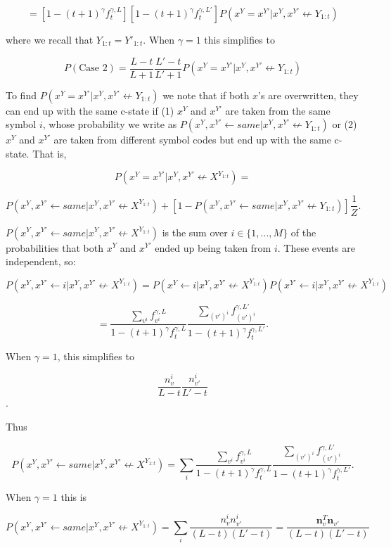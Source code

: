 \documentclass{article}
\begin{document}
$$= [1 - (t+1)^\gamma f^{\gamma,L}_t][1 - (t+1)^\gamma f^{\gamma,L'}_t]P(x^Y = x^{Y'}|x^Y, x^{Y'} \not\leftarrow Y_{1:t})$$

where we recall that $Y_{1:t} = Y'_{1:t}$. When $\gamma = 1$ this simplifies to

$$P(\textrm{Case 2}) = \frac{L-t}{L+1}\frac{L'-t}{L'+1}P(x^Y = x^{Y'}|x^Y, x^{Y'} \not\leftarrow Y_{1:t})$$

To find $P(x^Y = x^{Y'}|x^Y, x^{Y'} \not\leftarrow Y_{1:t})$ we note that if both $x$'s are overwritten, they can end up with the same c-state if (1) $x^Y$ and $x^{Y'}$ are taken from the same symbol $i$, whose probability we write as $P(x^Y, x^{Y'} \leftarrow same|x^Y, x^{Y'} \not\leftarrow Y_{1:t})$ or (2) $x^Y$ and $x^{Y'}$ are taken from different symbol codes but end up with the same c-state. That is,

$$P(x^Y = x^{Y'}|x^Y, x^{Y'} \not\leftarrow X^{Y_{1:t}}) =$$

$$P(x^Y, x^{Y'} \leftarrow same|x^Y, x^{Y'} \not\leftarrow X^{Y_{1:t}}) + [1 - P(x^Y, x^{Y'} \leftarrow same|x^Y, x^{Y'} \not\leftarrow Y_{1:t})]\frac{1}{Z}.$$

$P(x^Y, x^{Y'} \leftarrow same|x^Y, x^{Y'} \not\leftarrow X^{Y_{1:t}})$ is the sum over $i \in \{1, ..., M\}$ of the probabilities that both $x^Y$ and $x^{Y'}$ ended up being taken from $i$. These events are independent, so:

$$P(x^Y, x^{Y'} \leftarrow i|x^Y, x^{Y'} \not\leftarrow X^{Y_{1:t}}) = P(x^Y \leftarrow i|x^Y, x^{Y'} \not\leftarrow X^{Y_{1:t}})P(x^{Y'} \leftarrow i|x^Y, x^{Y'} \not\leftarrow X^{Y_{1:t}})$$

$$ = \frac{\sum\limits_{v^i} f_{v^i}^{\gamma,L}}{1 - (t+1)^\gamma f^{\gamma,L}_t} \frac{\sum\limits_{(v')^i} f^{\gamma,L'}_{(v')^i}}{1 - (t+1)^\gamma f^{\gamma,L'}_t}.$$

When $\gamma = 1$, this simplifies to

$$\frac{n^i_v}{L-t}\frac{n^i_{v'}}{L'-t}$$.

Thus

$$P(x^Y, x^{Y'} \leftarrow same|x^Y, x^{Y'} \not\leftarrow X^{Y_{1:t}}) = \sum_i \frac{\sum\limits_{v^i} f^{\gamma,L}_{v^i}}{1 - (t+1)^\gamma f^{\gamma,L}_t} \frac{\sum\limits_{(v')^i} f^{\gamma,L'}_{(v')^i}}{1 - (t+1)^\gamma f^{\gamma,L'}_t}.$$

When $\gamma = 1$ this is

$$P(x^Y, x^{Y'} \leftarrow same|x^Y, x^{Y'} \not\leftarrow X^{Y_{1:t}}) = \sum_i \frac{n^i_vn^i_{v'}}{(L-t)(L'-t)} = \frac{\mathbf{n}^T_v\mathbf{n}_{v'}}{(L-t)(L'-t)}$$
\end{document}
